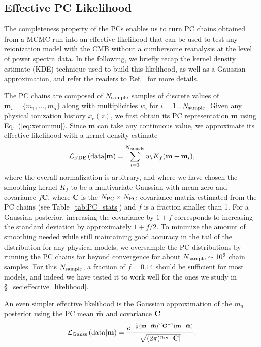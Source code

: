 \documentclass[prd,twocolumn,amsmath,amssymb,floatfix,superscriptaddress,nofootinbib]{revtex4-1}
\newcommand{\sample}{{\rm sample}}
\newcommand{\beq}{\begin{equation}}
\newcommand{\eeq}{\end{equation}}
\begin{document}
%
%
%
%

\subsection{Effective PC Likelihood}
\label{sec:KDE}
The completeness property of the PCs enables us to turn PC chains obtained from a MCMC run into an effective likelihood that can be used to test any reionization model with the CMB without a cumbersome reanalysis at the level of power spectra data. In the following, we briefly recap the kernel density estimate (KDE) technique used to build this likelihood, as well as a Gaussian approximation, and refer the readers to Ref.~\cite{Heinrich:2016ojb} for more details.

The PC chains are composed of $N_{\rm sample}$ samples of discrete values of $\mathbf{m}_i = \{m_1, \ldots, m_5\}$ along with multiplicities $w_i$ for $i = 1$...$N_{\rm sample}$. Given any physical ionization history $x_e(z)$, we first obtain its PC representation $\mathbf{m}$ using Eq.~(\ref{eq:xetommu}). Since $\mathbf{m}$ can take any continuous value, we approximate its effective likelihood with a kernel density estimate
\beq
{\cal L}_{\rm KDE}\left({\rm data}|\mathbf{m} \right)  = \sum_{i = 1}^{N_{\rm sample}} w_i K_f(\mathbf{m}-\mathbf{m}_i),
\eeq
where the overall normalization is arbitrary, and where we have chosen the smoothing kernel $K_f$ to be a  multivariate Gaussian with mean zero and covariance $f\mathbf{C}$, where $\mathbf{C}$ is the $N_{\rm PC} \times N_{\rm PC}$ covariance matrix estimated from the PC chains (see Table~\ref{tab:PC_stats}) and $f$ is a fraction smaller than 1.
For a Gaussian posterior, increasing the covariance by $1+f$ corresponds to increasing the standard deviation by approximately $1+f/2$. To minimize the amount of smoothing needed while still maintaining good accuracy in the tail of the distribution for any physical models, we oversample the PC distributions by running the PC chains far beyond convergence for about $N_{\sample} \sim 10^6$ chain samples. 
For this $N_{\sample}$, a fraction of $f = 0.14$ should be sufficient for most models, and indeed we have tested it to work well for the ones we study in \S~\ref{sec:effective_likelihood}.

An even simpler effective likelihood is the Gaussian approximation of the $m_a$ posterior using the PC mean $\bar{\bf m}$ and covariance $\bf C$
%
\begin{equation}
 {\cal L}_{\rm Gauss}\left({\rm data}|\mathbf{m} \right) = \frac{ e^{-\frac{1}{2} ({\bf m}-\bar{\bf m})^T {\bf C}^{-1} ({\bf m}-\bar{\bf m}) } }{\sqrt{(2\pi)^{n_{\rm PC}} | \mathbf{C}| }}.
 \label{eq:gaussian}
 \end{equation}
%
\end{document}
